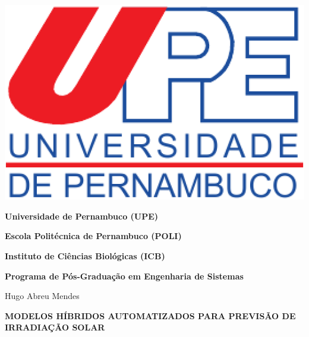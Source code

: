 \begin{center}
\begin{minipage}[b]{0.15\linewidth}
\end{minipage} \hfill
\begin{minipage}[b]{0.2\linewidth}
\includegraphics[width=\textwidth]{Figuras/Capa/upelogo.eps}
\end{minipage}

{\textbf{Universidade de Pernambuco (UPE)}}%

{\textbf{Escola Politécnica de Pernambuco (POLI)}}%

{\textbf{Instituto de Ciências Biológicas (ICB)}} \\ \vspace{2ex}

{\textbf{Programa de Pós-Graduação em Engenharia de Sistemas}} \\ \vspace{1ex}

\vspace{0.8in}

{\Large Hugo Abreu Mendes}\\

\vspace{1in}

{\Large \textbf{MODELOS HÍBRIDOS AUTOMATIZADOS PARA PREVISÃO DE IRRADIAÇÃO SOLAR}} \\

\vspace{0.3in}




\end{center}

